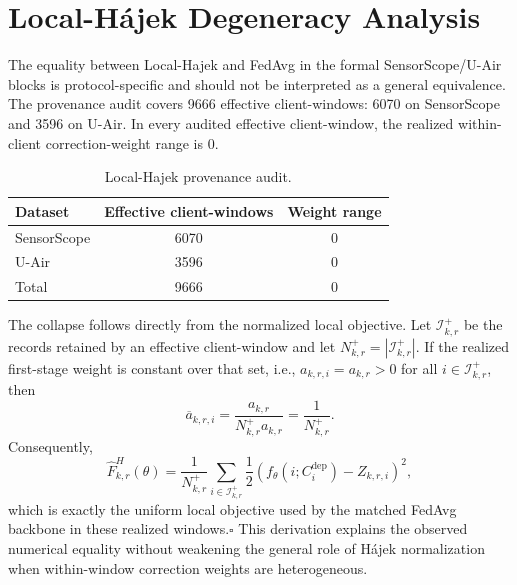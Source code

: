\section{Local-H\'ajek Degeneracy Analysis}
\label{app:local_hajek}

The equality between Local-Hajek and FedAvg in the formal SensorScope/U-Air
blocks is protocol-specific and should not be interpreted as a general
equivalence.  The provenance audit covers
9666 effective client-windows: 6070 on SensorScope and
3596 on U-Air.  In every audited effective client-window, the realized
within-client correction-weight range is 0.

\begin{table}[!t]
\centering
\caption{Local-Hajek provenance audit.}
\label{tab:app_local_hajek}
\footnotesize
\setlength{\tabcolsep}{5pt}
\begin{tabular*}{\columnwidth}{@{\extracolsep{\fill}}lcc}
\toprule
Dataset & Effective client-windows & Weight range\\
\midrule
SensorScope & 6070 & $0$\\
U-Air & 3596 & $0$\\
\midrule
Total & 9666 & $0$\\
\bottomrule
\end{tabular*}
\end{table}

The collapse follows directly from the normalized local objective.  Let
$\mathcal I_{k,r}^{+}$ be the records retained by an effective client-window
and let $N_{k,r}^{+}=|\mathcal I_{k,r}^{+}|$.  If the realized first-stage
weight is constant over that set, i.e.,
$a_{k,r,i}=a_{k,r}>0$ for all $i\in\mathcal I_{k,r}^{+}$, then
\begin{equation}
 \overline a_{k,r,i}
 =
 \frac{a_{k,r}}
 {N_{k,r}^{+}a_{k,r}}
 =
 \frac{1}{N_{k,r}^{+}}.
 \label{eq:app_local_hajek_uniform}
\end{equation}
Consequently,
\begin{equation}
 \widehat F^H_{k,r}(\theta)
 =
 \frac{1}{N_{k,r}^{+}}
 \sum_{i\in\mathcal I_{k,r}^{+}}
 \frac{1}{2}
 \left(
 f_\theta(i;C_i^{\mathrm{dep}})-Z_{k,r,i}
 \right)^2,
 \label{eq:app_local_hajek_collapse}
\end{equation}
which is exactly the uniform local objective used by the matched FedAvg
backbone in these realized windows.\hfill$\square$  This derivation explains the observed
numerical equality without weakening the general role of H\'ajek normalization
when within-window correction weights are heterogeneous.


